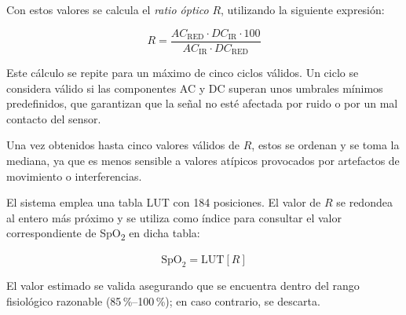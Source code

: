 Con estos valores se calcula el \textit{ratio óptico} $R$, utilizando la siguiente expresión:

\begin{equation}
R = \frac{AC_{\text{RED}} \cdot DC_{\text{IR}} \cdot 100}{AC_{\text{IR}} \cdot DC_{\text{RED}}}
\end{equation}

Este cálculo se repite para un máximo de cinco ciclos válidos. Un ciclo se considera válido si las componentes AC y DC superan unos umbrales mínimos predefinidos, que garantizan que la señal no esté afectada por ruido o por un mal contacto del sensor.

Una vez obtenidos hasta cinco valores válidos de \(R\), estos se ordenan y se toma la mediana, ya que es menos sensible a valores atípicos provocados por artefactos de movimiento o interferencias.

El sistema emplea una tabla LUT con 184 posiciones. El valor de \(R\) se redondea al entero más próximo y se utiliza como índice para consultar el valor correspondiente de SpO\textsubscript{2} en dicha tabla:


\begin{equation}
\text{SpO}_2 = \text{LUT}[R]
\end{equation}

El valor estimado se valida asegurando que se encuentra dentro del rango fisiológico razonable (85\,\%–100\,\%); en caso contrario, se descarta.



